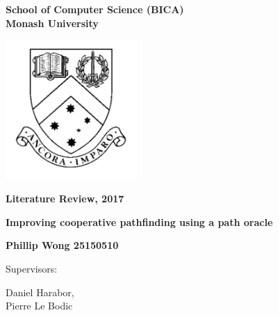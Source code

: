 \documentclass[a4paper,11pt]{article}
\begin{document}
\thispagestyle{empty} %
\renewcommand{\thepage}{\roman{page}}

\begin{spacing}{1.5}
\begin{center}
{\Large \bfseries
School of Computer Science (BICA) \\
Monash University}


\vspace*{30mm}

\includegraphics[width=5cm]{graphics/MonashCrest.pdf}

\vspace*{15mm}

{\large \bfseries
Literature Review, 2017
}

\vspace*{10mm}

{\LARGE \bfseries
Improving cooperative pathfinding using a path oracle
}

\vspace*{20mm}

{\large \bfseries
Phillip Wong 25150510

\vspace*{20mm}


Supervisors: \parbox[t]{50mm}{Daniel Harabor,\\Pierre Le Bodic}
}

\end{center}
\end{spacing}

\newpage

\tableofcontents

\newpage
\setcounter{page}{1}
\renewcommand{\thepage}{\arabic{page}}
\end{document}
